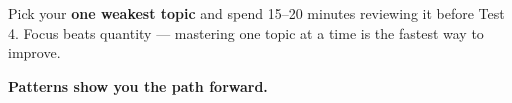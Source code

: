 {\begin{tcolorbox}[
    enhanced,
    colback=funYellowLight,
    colframe=funYellow!60,
    arc=10pt,
    boxrule=1pt,
    left=6mm, right=6mm, top=4mm, bottom=4mm,
]
\vspace{2mm}

Pick your \textbf{one weakest topic} and spend 15–20 minutes reviewing it before Test 4. Focus beats quantity — mastering one topic at a time is the fastest way to improve.
\end{tcolorbox}

\vspace{4mm}

\begin{center}
{\large\bfseries\color{funOrangeDark} \faMapSigns\hspace{2mm}Patterns show you the path forward.\hspace{2mm}\faMapSigns}
\end{center}

}
\newpage
